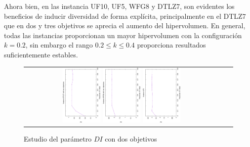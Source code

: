 Ahora bien, en las instancia  UF10, UF5, WFG8 y DTLZ7, son evidentes los beneficios de inducir diversidad de forma explícita, principalmente en el DTLZ7 que en dos y tres objetivos se aprecia el aumento del hipervolumen.
%
En general, todas las instancias proporcionan un mayor hipervolumen con la configuración $k=0.2$, sin embargo el rango $0.2 \leq k \leq 0.4$ proporciona resultados suficientemente estables.
%
\begin{figure}[H]
\centering
\caption{Estudio del parámetro $DI$ con dos objetivos}
\label{fig:Parametrization_2}
\begin{tabular}{ccc}
   \includegraphics[width=0.2\textwidth, angle=-90,origin=c]{Figures_Chapter7/Results_Chapter3/EPS_DI/2obj_DTLZ7.eps}
   \includegraphics[width=0.2\textwidth, angle=-90,origin=c]{Figures_Chapter7/Results_Chapter3/EPS_DI/2obj_WFG8.eps} 
   \includegraphics[width=0.2\textwidth, angle=-90,origin=c]{Figures_Chapter7/Results_Chapter3/EPS_DI/UF5.eps} &
\end{tabular}
\end{figure}


